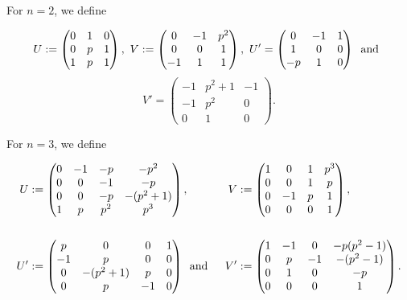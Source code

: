 \documentclass[a4paper,11pt]{amsart}
\begin{document}
For $n=2$, we define 

$$U:=\begin{pmatrix}
0& 1& 0\\
0& p& 1\\
1& p& 1
  \end{pmatrix},\text{  }
V:=\begin{pmatrix}
0& -1& p^2\\
0& 0& 1\\
-1& 1& 1
  \end{pmatrix},\text{  }
U'=\begin{pmatrix}
0& -1& 1\\
1& 0& 0\\
-p& 1& 0
  \end{pmatrix}\text{ \hspace{2pt}and\hspace{2pt} }$$
$$V'= \begin{pmatrix}
-1& p^2 + 1& -1\\
-1& p^2& 0\\
0& 1& 0
  \end{pmatrix}.
$$

\vspace*{5pt}
For $n=3$, we define

\begin{alignat*}{3}U&:=\begin{pmatrix}
0&-1&-p&-p^2\\
0&0&-1&-p\\
0&0&-p&-(p^2+1)\\
1 &p &p^2 &p^3
  \end{pmatrix},\text{  }
&V&:=\begin{pmatrix}
1&0&1&p^3\\
0&0&1&p\\
0&-1&p&1\\
0&0&0&1
  \end{pmatrix},\\%
\\
U'&:=\begin{pmatrix}
p&0&0&1\\
-1&p&0&0\\
0&-(p^2+1)&p&0\\
0&p&-1&0
  \end{pmatrix}\text{ \hspace{2pt}and\hspace{2pt} }
&V'&:= \begin{pmatrix}
1 &-1 &0 &-p(p^2-1)\\
0 &p &-1 &-(p^2-1)\\
0&1&0&-p\\
0&0&0&1
\end{pmatrix}.
\end{alignat*}
\end{document}
